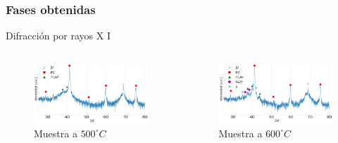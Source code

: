 \documentclass[11pt]{beamer}
\begin{document}
		\subsubsection{Fases obtenidas}
			\begin{frame}{Difracción por rayos X I}
			\begin{columns}
				\begin{column}{.49\textwidth}
					\begin{figure}
						\includegraphics[scale=0.1]{img/RX/NiPoor_500.png}
						\caption*{Muestra a $500 ^\circ C$}
					\end{figure}
				\end{column}
				\begin{column}{.49\textwidth}
					\begin{figure}
						\includegraphics[scale=0.1]{img/RX/NiPoor_600.png}
						\caption*{Muestra a $600 ^\circ C$}
					\end{figure}
				\end{column}
			\end{columns}	
			\end{frame}
			
\end{document}
